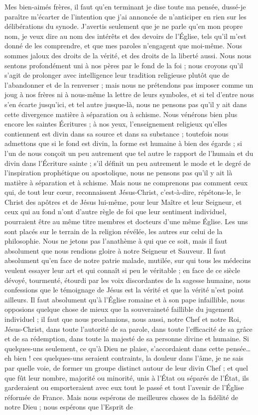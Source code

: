 Mes bien-aimés frères, il faut qu’en terminant je dise toute ma pensée, dussé-je paraître m’écarter de l’intention que j’ai annoncée de n’anticiper en rien sur les délibérations du synode. J’avertis seulement que je ne parle qu’en mon propre nom, \ocadr{} je veux dire au nom des intérêts et des devoirs de l’Église, tels qu’il m’est donné de les comprendre, \fcadr{} et que mes paroles n’engagent que moi-même. Nous sommes jaloux des droits de la vérité, et des droits de la liberté aussi. Nous nous sentons profondément uni à nos pères par le fond de la foi ; nous croyons qu’il s’agit de prolonger avec intelligence leur tradition religieuse plutôt que de l’abandonner et de la renverser ; mais nous ne prétendons pas imposer comme un joug à nos frères ni à nous-même la lettre de leurs symboles, et si tel d’entre nous s’en écarte jusqu’ici, et tel autre jusque-là, nous ne pensons pas qu’il y ait dans cette divergence matière à séparation ou à schisme. Nous vénérons bien plus encore les saintes Écritures ; à nos yeux, l’enseignement religieux qu’elles contiennent est divin dans sa source et dans sa substance ; toutefois nous admettons que si le fond est divin, la forme est humaine à bien des égards ; si l’un de nous conçoit un peu autrement que tel autre le rapport de l’humain et du divin dans l’Écriture sainte ; s’il définit un peu autrement le mode et le degré de l’inspiration prophétique ou apostolique, nous ne pensons pas qu’il y ait là matière à séparation et à schisme. Mais nous ne comprenons pas comment ceux qui, de tout leur cœur, reconnaissent Jésus-Christ, c’est-à-dire, répétons-le, le Christ des apôtres et de Jésus lui-même, pour leur Maître et leur Seigneur, et ceux qui au fond n’ont d’autre règle de foi que leur sentiment individuel, pourraient être au même titre membres et docteurs d’une même Église. Les uns sont placés sur le terrain de la religion révélée, les autres sur celui de la philosophie. Nous ne jetons pas l’anathème à qui que ce soit, mais il faut absolument que nous rendions gloire à notre Seigneur et Sauveur. Il faut absolument qu’en face de notre patrie malade, mutilée, sur qui tous les médecins veulent essayer leur art et qui connaît si peu le véritable ; en face de ce siècle dévoyé, tourmenté, étourdi par les voix discordantes de la sagesse humaine, nous confessions que le témoignage de Jésus est la vérité et que la vérité n’est point ailleurs. Il faut absolument qu’à l’Église romaine et à son pape infaillible, nous opposions quelque chose de mieux que la souveraineté faillible du jugement individuel ; il faut que nous proclamions, nous aussi, notre Chef et notre Roi, Jésus-Christ, dans toute l’autorité de sa parole, dans toute l’efficacité de sa grâce et de sa rédemption, dans toute la majesté de sa personne divine et humaine. Si quelques-uns seulement, ce qu’à Dieu ne plaise, s’accordaient dans cette pensée… eh bien ! ces quelques-uns seraient contraints, la douleur dans l’âme, je ne sais par quelle voie, de former un groupe distinct autour de leur divin Chef ; et quel que fût leur nombre, majorité ou minorité, unis à l’État ou séparés de l’État, ils garderaient ou emporteraient avec eux tout le passé et tout l’avenir de l’Église réformée de France. Mais nous espérons de meilleures choses de la fidélité de notre Dieu ; nous espérons que l’Esprit de 